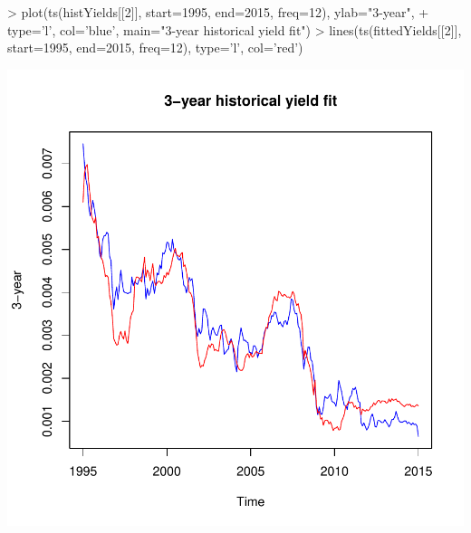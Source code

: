 \documentclass[12pt]{article}
\begin{document}
\begin{Schunk}
\begin{Sinput}
> plot(ts(histYields[[2]], start=1995, end=2015, freq=12), ylab="3-year", 
+   type='l', col='blue', main="3-year historical yield fit")
> lines(ts(fittedYields[[2]], start=1995, end=2015, freq=12), type='l', col='red')
\end{Sinput}
\end{Schunk}
\includegraphics{pricing_kernel_demo-006}
\end{document}
